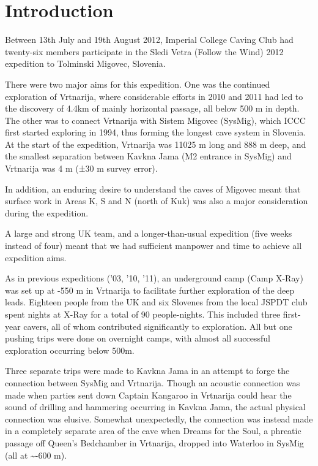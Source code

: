 \hypertarget{introduction-3}{%
\section{Introduction}\label{introduction-3}}

Between 13th July and 19th August 2012, Imperial College Caving Club had
twenty-six members participate in the Sledi Vetra (Follow the Wind) 2012
expedition to Tolminski Migovec, Slovenia.

There were two major aims for this expedition. One was the continued
exploration of Vrtnarija, where considerable efforts in 2010 and 2011
had led to the discovery of 4.4km of mainly horizontal passage, all
below 500 m in depth. The other was to connect Vrtnarija with Sistem
Migovec (SysMig), which ICCC first started exploring in 1994, thus
forming the longest cave system in Slovenia. At the start of the
expedition, Vrtnarija was 11025 m long and 888 m deep, and the smallest
separation between Kavkna Jama (M2 entrance in SysMig) and Vrtnarija was
4 m (±30 m survey error).

In addition, an enduring desire to understand the caves of Migovec meant
that surface work in Areas K, S and N (north of Kuk) was also a major
consideration during the expedition.

A large and strong UK team, and a longer-than-usual expedition (five
weeks instead of four) meant that we had sufficient manpower and time to
achieve all expedition aims.

As in previous expeditions ('03, '10, '11), an underground camp (Camp
X-Ray) was set up at -550 m in Vrtnarija to facilitate further
exploration of the deep leads. Eighteen people from the UK and six
Slovenes from the local JSPDT club spent nights at X-Ray for a total of
90 people-nights. This included three first-year cavers, all of whom
contributed significantly to exploration. All but one pushing trips were
done on overnight camps, with almost all successful exploration
occurring below 500m.

Three separate trips were made to Kavkna Jama in an attempt to forge the
connection between SysMig and Vrtnarija. Though an acoustic connection
was made when parties sent down Captain Kangaroo in Vrtnarija could hear
the sound of drilling and hammering occurring in Kavkna Jama, the actual
physical connection was elusive. Somewhat unexpectedly, the connection
was instead made in a completely separate area of the cave when Dreams
for the Soul, a phreatic passage off Queen's Bedchamber in Vrtnarija,
dropped into Waterloo in SysMig (all at \textasciitilde{}-600 m).

